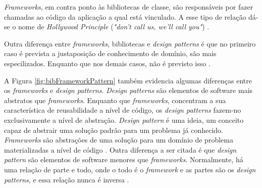 \par
\indent \textit{Frameworks}, em contra ponto às bibliotecas de classe, são responsáveis por fazer chamadas ao código da aplicação a qual está vinculado. A esse tipo de relação dá-se o nome de \textit{Hollywood Principle} (\textit{"don't call us, we'll call you"}) \cite{sauve2006}.
\par
\indent Outra diferença entre \textit{frameworks}, bibliotecas e \textit{design patterns} é que no  primeiro caso é prevista a justaposição de conhecimento de domínio, são mais especilizados. Enquanto que nos demais casos, não é previsto isso \cite{sauve2006}.
\par
\indent A Figura  \ref{fig:bibFrameworkPattern} também evidencia algumas diferenças entre os \textit{frameworks} e \textit{design patterns}. \textit{Design patterns} são elementos de software mais abstratos que \textit{frameworks}. Enquanto que \textit{frameworks}, concentram a sua característica de reusabilidade a nível de código, os \textit{design patterns} fazem-no exclusivamente a nível de abstração. \textit{Design pattern} é uma ideia, um conceito capaz de abstrair uma solução padrão para um problema já conhecido. \textit{Frameworks} são abstrações de uma solução para um domínio de problema materializadas a nível de código \cite{sauve2006}. Outra diferença a ser citada é que \textit{design pattern} são elementos de software menores que \textit{frameworks}. Normalmente, há uma relação de parte e todo, onde o todo é o \textit{framework} e as partes são os \textit{design patterns}, e essa relação nunca é inversa \cite{sauve2006}.

